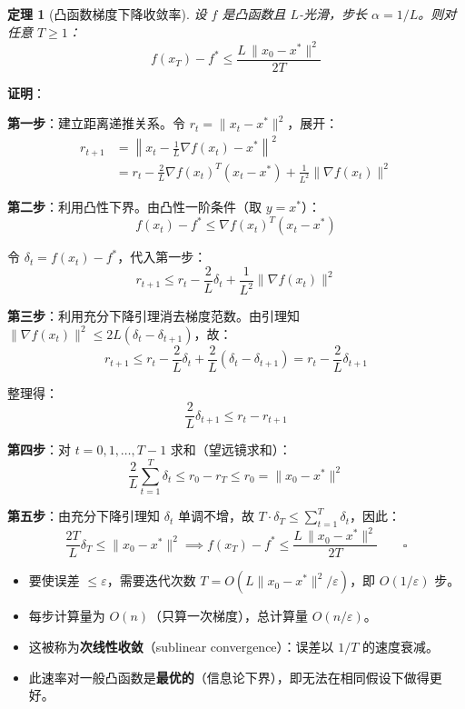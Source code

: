 \documentclass[12pt, a4paper]{ctexart}
\newtheorem{theorem}{定理}[section]
\begin{document}
\begin{blackboard}

\begin{theorem}[凸函数梯度下降收敛率]
设 $f$ 是凸函数且 $L$-光滑，步长 $\alpha = 1/L$。则对任意 $T \geq 1$：
\[
    f(x_T) - f^* \leq \frac{L\,\|x_0 - x^*\|^2}{2T}
\]
\end{theorem}

\textbf{证明}：

\textbf{第一步}：建立距离递推关系。令 $r_t = \|x_t - x^*\|^2$，展开：
\begin{align*}
    r_{t+1} &= \left\|x_t - \frac{1}{L}\nabla f(x_t) - x^*\right\|^2 \\
    &= r_t - \frac{2}{L}\nabla f(x_t)^T(x_t - x^*) + \frac{1}{L^2}\|\nabla f(x_t)\|^2
\end{align*}

\textbf{第二步}：利用凸性下界。由凸性一阶条件（取 $y = x^*$）：
\[
    f(x_t) - f^* \leq \nabla f(x_t)^T(x_t - x^*)
\]

令 $\delta_t = f(x_t) - f^*$，代入第一步：
\[
    r_{t+1} \leq r_t - \frac{2}{L}\delta_t + \frac{1}{L^2}\|\nabla f(x_t)\|^2
\]

\textbf{第三步}：利用充分下降引理消去梯度范数。由引理知 $\|\nabla f(x_t)\|^2 \leq 2L(\delta_t - \delta_{t+1})$，故：
\[
    r_{t+1} \leq r_t - \frac{2}{L}\delta_t + \frac{2}{L}(\delta_t - \delta_{t+1})
    = r_t - \frac{2}{L}\delta_{t+1}
\]

整理得：
\[
    \frac{2}{L}\delta_{t+1} \leq r_t - r_{t+1}
\]

\textbf{第四步}：对 $t = 0, 1, \ldots, T-1$ 求和（望远镜求和）：
\[
    \frac{2}{L}\sum_{t=1}^{T}\delta_t \leq r_0 - r_T \leq r_0 = \|x_0 - x^*\|^2
\]

\textbf{第五步}：由充分下降引理知 $\delta_t$ 单调不增，故 $T \cdot \delta_T \leq \sum_{t=1}^T \delta_t$，因此：
\[
    \frac{2T}{L}\delta_T \leq \|x_0 - x^*\|^2
    \implies \boxed{f(x_T) - f^* \leq \frac{L\,\|x_0 - x^*\|^2}{2T}} \qquad \square
\]

\end{blackboard}

\begin{keypoint}[$O(1/T)$ 收敛率的含义]

\begin{itemize}
    \item 要使误差 $\leq \varepsilon$，需要迭代次数 $T = O(L \|x_0 - x^*\|^2 / \varepsilon)$，即 $O(1/\varepsilon)$ 步。
    \item 每步计算量为 $O(n)$（只算一次梯度），总计算量 $O(n/\varepsilon)$。
    \item 这被称为\textbf{次线性收敛}（sublinear convergence）：误差以 $1/T$ 的速度衰减。
    \item 此速率对一般凸函数是\textbf{最优的}（信息论下界），即无法在相同假设下做得更好。
\end{itemize}

\end{keypoint}
\end{document}
